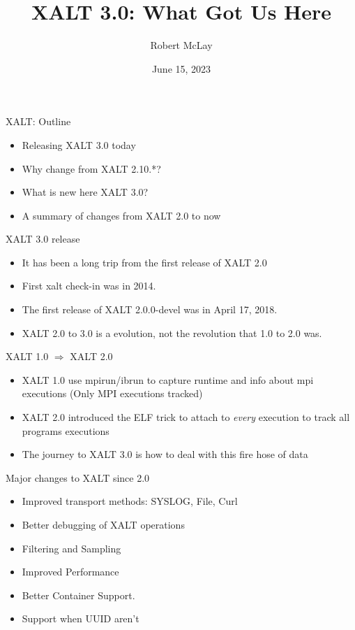 \documentclass{beamer}
\begin{document}
\title[XALT]{XALT 3.0: What Got Us Here}
\author{Robert McLay}
\date{June 15, 2023}

\frame{\titlepage}

\begin{frame}{XALT: Outline}
  \begin{itemize}
    \item Releasing XALT 3.0 today
    \item Why change from XALT 2.10.*?
    \item What is new here XALT 3.0?
    \item A summary of changes from XALT 2.0 to now
  \end{itemize}
\end{frame}

\begin{frame}{XALT 3.0 release}
  \begin{itemize}
    \item It has been a long trip from the first release of XALT 2.0
    \item First xalt check-in was in 2014.
    \item The first release of XALT 2.0.0-devel was in April 17, 2018.
    \item XALT 2.0 to 3.0 is a evolution, not the revolution that 1.0
      to 2.0 was.
  \end{itemize}
\end{frame}

\begin{frame}{XALT 1.0 $\Rightarrow$ XALT 2.0}
  \begin{itemize}
    \item XALT 1.0 use mpirun/ibrun to capture runtime and info about
      mpi executions (Only MPI executions tracked)
    \item XALT 2.0 introduced the ELF trick to attach to \emph{every}
      execution to track all programs executions
    \item The journey to XALT 3.0 is how to deal with this fire hose of
      data
  \end{itemize}
\end{frame}

\begin{frame}{Major changes to XALT since 2.0}
  \begin{itemize}
    \item Improved transport methods: SYSLOG, File, Curl
    \item Better debugging of XALT operations
    \item Filtering and Sampling
    \item Improved Performance
    \item Better Container Support.
    \item Support when UUID aren't
  \end{itemize}
\end{frame}
\end{document}
